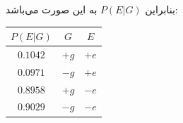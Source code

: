 \begin{ابجد}
بنابراین $P(E|G)$ به این صورت می‌باشد:
\begin{table}[H]
    \centering
    \begin{tabular}{|c|c|c|}
        \hline
        $P(E|G)$ & $G$  & $E$  \\ \hline
        $0.1042$ & $+g$ & $+e$ \\ \hline
        $0.0971$ & $-g$ & $+e$ \\ \hline
        $0.8958$ & $+g$ & $-e$ \\ \hline
        $0.9029$ & $-g$ & $-e$ \\ \hline
    \end{tabular}
\end{table}

\end{ابجد}